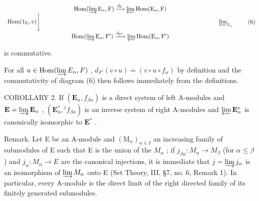 \[
\begin{array}{c} \operatorname{Hom} (\varinjlim \mathrm{E} _ {\alpha}, \mathrm{F}) \xrightarrow {d _ {\mathrm{F}}} \varprojlim \operatorname{Hom} (\mathrm{E} _ {\alpha}, \mathrm{F}) \\ \operatorname{Hom} (1 _ {\mathrm{E}}, v) \Bigg \downarrow \qquad \qquad \qquad \qquad \qquad \qquad \qquad \qquad \qquad \qquad \qquad \qquad \qquad \qquad \qquad \varprojlim_ {\overline {{v}} _ {\alpha}} \\ \operatorname{Hom} (\varinjlim \mathrm{E} _ {\alpha}, \mathrm{F} ^ {\prime}) \xrightarrow {d _ {\mathrm{F} ^ {\prime}}} \varprojlim \operatorname{Hom} (\mathrm{E} _ {\alpha}, \mathrm{F} ^ {\prime}) \end{array}\tag{6}
\]

is commutative.

For all \(u \in \operatorname{Hom}(\varinjlim E_{\alpha}, F)\) , \(d_{F'}(v \circ u) = (v \circ u \circ f_{\alpha})\) by definition and the commutativity of diagram (6) then follows immediately from the definitions.

COROLLARY 2. If \((\mathbf{E}_{\alpha}, f_{\beta \alpha})\) is a direct system of left A-modules and \(\mathbf{E} = \varinjlim \mathbf{E}_{\alpha}\) , \((\mathbf{E}_{\alpha}^{*}, {}^t f_{\beta \alpha})\) is an inverse system of right A-modules and \(\varprojlim \mathbf{E}_{\alpha}^{*}\) is canonically isomorphic to \(\mathbf{E}^{*}\) .

Remark. Let E be an A-module and \((\mathrm{M}_{\alpha})_{\alpha\in I}\) an increasing family of submodules of E such that E is the union of the \(M_{\alpha}\) ; if \(j_{\beta\alpha}:M_{\alpha}\to M_{\beta}\) (for \(\alpha\leqslant\beta\) ) and \(j_{\alpha}:M_{\alpha}\to E\) are the canonical injections, it is immediate that \(j=\varinjlim j_{\alpha}\) is an isomorphism of \(\varinjlim M_{\alpha}\) onto E (Set Theory, III, §7, no. 6, Remark 1). In particular, every A-module is the direct limit of the right directed family of its finitely generated submodules.

